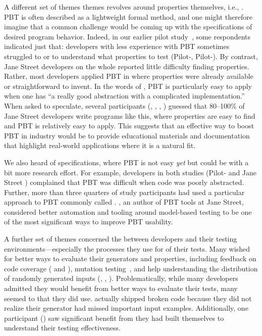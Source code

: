 A different set of themes
themes revolves around properties themselves, i.e.,
.
PBT is often described as a lightweight formal method, and one
might therefore imagine that a common challenge would be coming up with the
specifications of desired program behavior. Indeed, in our earlier pilot
study~\cite{goldstein_problems_2022}, some respondents indicated just that:
developers with less experience with PBT
sometimes struggled to  or to understand what properties to test (Pilot-,
Pilot-).
By contrast, Jane Street developers on the whole reported
little difficulty finding
properties. Rather, most developers applied PBT in
 where properties were already
available or straightforward to invent. In the words of
, PBT is particularly easy to apply
when
one has ``a really good abstraction with a complicated implementation.''
When asked to speculate, several participants (, ,
, ) guessed
that 80--100\% of Jane Street
developers write programs like this,
where properties are easy to find and
PBT is relatively easy to apply. This suggests that an effective way to
boost PBT in industry would be to provide
educational materials and documentation that highlight
real-world applications where it is a natural
fit.

We also heard  of specifications, where PBT is not easy {\em yet} but
could be with a bit more research effort. For example, developers in
both studies (Pilot- and Jane Street ) complained
that PBT was difficult when code was poorly abstracted.  Further,
more than three
quarters of study participants had used a particular approach to PBT commonly
called .  , an author of PBT tools
at Jane Street, considered better automation and tooling around model-based
testing to be one of the most significant ways to improve PBT usability.


A further set of themes concerned the
 between developers and their
testing environments---especially the processes they use
for  of their tests. Many
wished for
better ways to evaluate their generators and properties, including
feedback on code coverage ( and ),
mutation
testing~\cite{papadakis_mutation_2018}, and help understanding the
distribution of randomly generated
inputs (, , ). Problematically,
while many developers admitted they would benefit from better ways to
evaluate their tests, many seemed to
 that they did use.  actually shipped broken code because
they did not realize their generator had missed important input
examples.
Additionally, one participant () saw significant benefit from
 they had built themselves to
understand their testing effectiveness.

